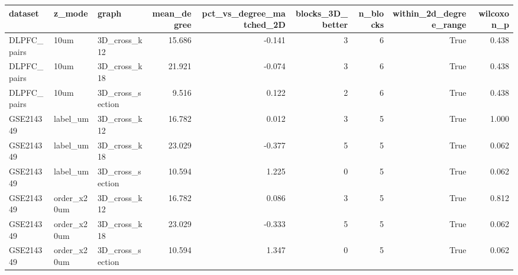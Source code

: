 \begin{tabular}{lllrrrrrr}
\toprule
dataset & z_mode & graph & mean_degree & pct_vs_degree_matched_2D & blocks_3D_better & n_blocks & within_2d_degree_range & wilcoxon_p \\
\midrule
DLPFC_pairs & 10um & 3D_cross_k12 & 15.686 & -0.141 & 3 & 6 & True & 0.438 \\
DLPFC_pairs & 10um & 3D_cross_k18 & 21.921 & -0.074 & 3 & 6 & True & 0.438 \\
DLPFC_pairs & 10um & 3D_cross_section & 9.516 & 0.122 & 2 & 6 & True & 0.438 \\
GSE214349 & label_um & 3D_cross_k12 & 16.782 & 0.012 & 3 & 5 & True & 1.000 \\
GSE214349 & label_um & 3D_cross_k18 & 23.029 & -0.377 & 5 & 5 & True & 0.062 \\
GSE214349 & label_um & 3D_cross_section & 10.594 & 1.225 & 0 & 5 & True & 0.062 \\
GSE214349 & order_x20um & 3D_cross_k12 & 16.782 & 0.086 & 3 & 5 & True & 0.812 \\
GSE214349 & order_x20um & 3D_cross_k18 & 23.029 & -0.333 & 5 & 5 & True & 0.062 \\
GSE214349 & order_x20um & 3D_cross_section & 10.594 & 1.347 & 0 & 5 & True & 0.062 \\
\bottomrule
\end{tabular}
